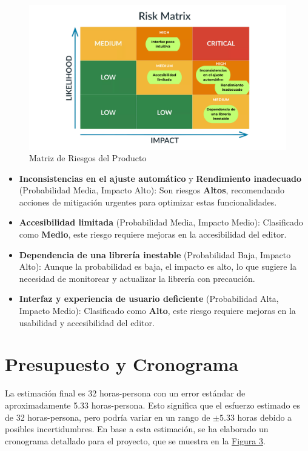 \documentclass[stu, 12pt, letterpaper, donotrepeattitle, floatsintext, natbib]{apa7}
\begin{document}
\begin{figure}[!ht]
    \centering
    \caption{Matriz de Riesgos del Producto}
    \label{fig:product_risk_matrix}
    \includegraphics[width=\textwidth]{../imgs/producto.png}
\end{figure}

\begin{itemize}
    \item \textbf{Inconsistencias en el ajuste automático} y \textbf{Rendimiento inadecuado} (Probabilidad Media, Impacto Alto): Son riesgos \textbf{Altos}, recomendando acciones de mitigación urgentes para optimizar estas funcionalidades.
    \item \textbf{Accesibilidad limitada} (Probabilidad Media, Impacto Medio): Clasificado como \textbf{Medio}, este riesgo requiere mejoras en la accesibilidad del editor.
    \item \textbf{Dependencia de una librería inestable} (Probabilidad Baja, Impacto Alto): Aunque la probabilidad es baja, el impacto es alto, lo que sugiere la necesidad de monitorear y actualizar la librería con precaución.
    \item \textbf{Interfaz y experiencia de usuario deficiente} (Probabilidad Alta, Impacto Medio): Clasificado como \textbf{Alto}, este riesgo requiere mejoras en la usabilidad y accesibilidad del editor.
\end{itemize}

\section{\large Presupuesto y Cronograma}
La estimación final es 32 horas-persona con un error estándar de aproximadamente 5.33 horas-persona. Esto significa que el esfuerzo estimado es de 32 horas-persona, pero podría variar en un rango de \(\pm 5.33\) horas debido a posibles incertidumbres. En base a esta estimación, se ha elaborado un cronograma detallado para el proyecto, que se muestra en la \hyperref[fig:cronograma]{Figura 3}.
\end{document}
